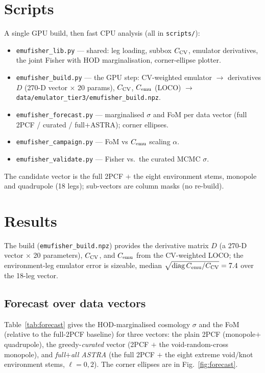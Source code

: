 \documentclass[11pt]{article}
\newcommand{\code}[1]{\texttt{#1}}
\newcommand{\Cemu}{C_{\rm emu}}
\newcommand{\Ccv}{C_{\rm CV}}
\begin{document}
\section{Scripts}
A single GPU build, then fast CPU analysis (all in \code{scripts/}):
\begin{itemize}
\item \code{emufisher\_lib.py} --- shared: leg loading, subbox $C_{\rm CV}$, emulator
  derivatives, the joint Fisher with HOD marginalisation, corner-ellipse plotter.
\item \code{emufisher\_build.py} --- the GPU step: CV-weighted emulator $\to$ derivatives
  $D$ (270-D vector $\times$ 20 params), $C_{\rm CV}$, $C_{\rm emu}$ (LOCO) $\to$
  \code{data/emulator\_tier3/emufisher\_build.npz}.
\item \code{emufisher\_forecast.py} --- marginalised $\sigma$ and FoM per data vector
  (full 2PCF / curated / full$+$ASTRA); corner ellipses.
\item \code{emufisher\_campaign.py} --- FoM vs $C_{\rm emu}$ scaling $\alpha$.
\item \code{emufisher\_validate.py} --- Fisher vs.\ the curated MCMC $\sigma$.
\end{itemize}
The candidate vector is the full 2PCF $+$ the eight environment stems, monopole and
quadrupole (18 legs); sub-vectors are column masks (no re-build).

\section{Results}
The build (\code{emufisher\_build.npz}) provides the derivative matrix $D$ (a 270-D
vector $\times$ 20 parameters), $\Ccv$, and $\Cemu$ from the CV-weighted LOCO; the
environment-leg emulator error is sizeable, median
$\sqrt{\mathrm{diag}\,\Cemu/\Ccv}=7.4$ over the 18-leg vector.

\subsection{Forecast over data vectors}
Table~\ref{tab:forecast} gives the HOD-marginalised cosmology $\sigma$ and the FoM
(relative to the full-2PCF baseline) for three vectors: the plain 2PCF (monopole$+$
quadrupole), the greedy-\emph{curated} vector (2PCF $+$ the void-random-cross monopole),
and \emph{full$+$all ASTRA} (the full 2PCF $+$ the eight extreme void/knot environment
stems, $\ell=0,2$). The corner ellipses are in Fig.~\ref{fig:forecast}.
\end{document}
